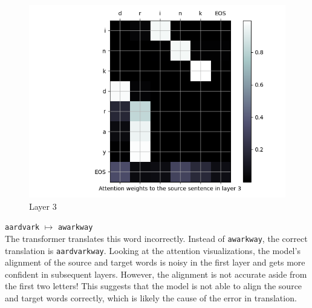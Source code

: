 \begin{enumarabic}
\begin{figure}[H]
\begin{minipage}[b]{0.33\textwidth}
        \centering
        \includegraphics[width=\textwidth]{figures/drink-2.png}
        \caption{Layer 3}
        \label{fig:drink-2}
      \end{minipage}
    \end{figure}

  \item \verb|aardvark| $\mapsto$ \verb|awarkway| \\
    The transformer translates this word incorrectly.
    Instead of \verb|awarkway|, the correct translation is \verb|aardvarkway|.
    Looking at the attention visualizations, the model's alignment of the source
    and target words is noisy in the first layer and gets more confident in subsequent
    layers. However, the alignment is not accurate aside from the first two letters!
    This suggests that the model is not able to align the source and target words
    correctly, which is likely the cause of the error in translation.
    

\end{enumarabic}
